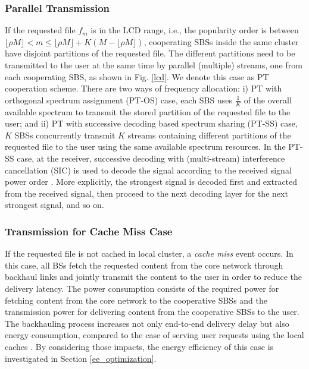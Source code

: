 \documentclass[twocolumns,10pt]{IEEEtran}
\begin{document}
\subsubsection{Parallel Transmission}
If the requested file $f_m$ is in the LCD range, i.e., the popularity order is between $\lfloor\rho M \rfloor < m\leq \lfloor \rho M\rfloor+K(M-\lfloor \rho M\rfloor) $, cooperating SBSs inside the same cluster have disjoint partitions of the requested file. The different partitions need to be transmitted to the user at the same time by parallel (multiple) streams, one from each cooperating SBS, as shown in Fig. \ref{lcd}. We denote this case as PT cooperation scheme.
There are two ways of frequency allocation: i) PT with orthogonal spectrum assignment (PT-OS) case, each SBS uses $\frac{1}{K}$ of the overall available spectrum to transmit the stored partition of the requested file to the user; and ii) PT with successive decoding based spectrum sharing (PT-SS) case, 
$K$ SBSs concurrently transmit $K$ streams containing different partitions of the requested file to the user using the same available spectrum resources. 
In the PT-SS case, at the receiver, successive decoding with (multi-stream) interference cancellation (SIC) is used to decode the signal according to the received signal power order \cite{SIC, zhang2014}. More explicitly, the strongest signal is decoded first and extracted from the received signal, then proceed to the next decoding layer for the next strongest signal, and so on.

\subsubsection{Transmission for Cache Miss Case}
If the requested file is not cached in local cluster, a {\emph{cache miss}} event occurs. In this case, all BSs fetch the requested content from the core network through backhaul links and jointly transmit the content to the user in order to reduce the delivery latency. The power consumption consists of the required power for fetching content from the core network to the cooperative SBSs and the transmission power for delivering content from the cooperative SBSs to the user. 
The backhauling process increases not only end-to-end delivery delay but also energy consumption, compared to the case of serving user requests using the local caches \cite{backhaul_2, ee_hetnets}. By considering those impacts, the energy efficiency of this case is investigated in Section \ref{ee_optimization}.
\end{document}
